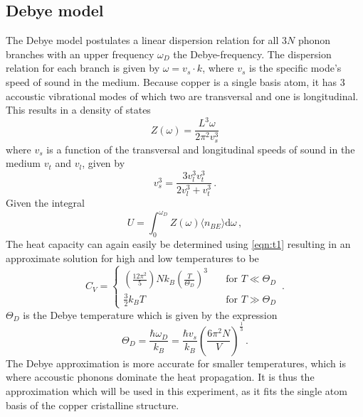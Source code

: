 \subsection{Debye model}
The Debye model postulates a linear dispersion relation for all $3N$ phonon branches with an upper frequency $\omega_D$ the Debye-frequency. The dispersion relation for each branch is given by $\omega = v_s \cdot k$, where $v_s$ is the specific mode's speed of sound in the medium.
Because copper is a single basis atom, it has 3 accoustic vibrational modes of which two are transversal and one is longitudinal. This results in a density of states 
\begin{equation}
    Z \left(\omega\right) = \frac{L^3 \omega}{2 \pi^2 v_s^3}
\end{equation}
where $v_s$ is a function of the transversal and longitudinal speeds of sound in the medium $v_t$ and $v_l$, given by
\begin{equation}
    \label{eqn:t5}
    v_s^3 = \frac{3 v_l^3 v_t^3}{2v_l^3 + v_t^3} \, .
\end{equation}
Given the integral
\begin{equation}
U = \int_0^{\omega_D} Z\left(\omega\right) \langle n_{BE} \rangle \text{d}\omega \, ,
\end{equation}
The heat capacity can again easily be determined using \autoref{eqn:t1} resulting in an approximate solution for high and low temperatures to be
\begin{equation}
    C_V = 
    \begin{cases}
        \left(\frac{12 \pi^2}{5}\right) N k_B \left( \frac{T}{\Theta_D} \right)^3 &\quad \text{for } T \ll \Theta_D\\
        \frac{3}{2} k_B T &\quad \text{for } T \gg \Theta_D
    \end{cases}
    \, .
\end{equation}
$\Theta_D$ is the Debye temperature which is given by the expression
\begin{equation}
    \label{eqn:t4}
    \Theta_D = \frac{\hbar \omega_D}{k_B} = \frac{\hbar v_s}{k_B}\left( \frac{6 \pi^2 N}{V} \right)^{\frac{1}{3}} \, .
\end{equation}
The Debye approximation is more accurate for smaller temperatures, which is where accoustic phonons dominate the heat propagation. It is thus the approximation which will be used in this experiment, as it fits the single atom basis of the copper cristalline structure.



\newpage
